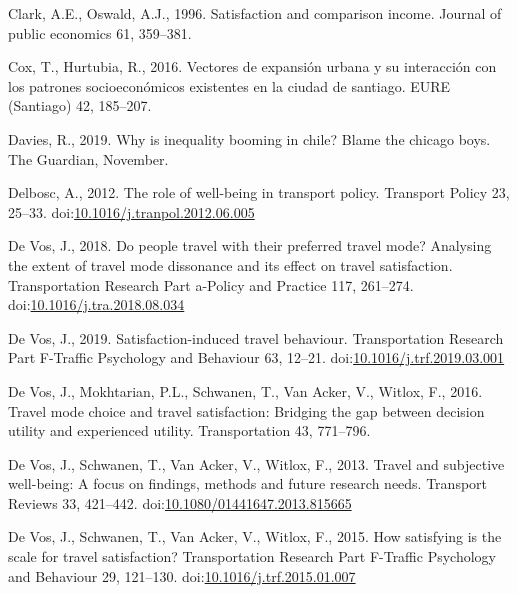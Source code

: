 \documentclass[]{elsarticle} %
\begin{document}
\leavevmode\hypertarget{ref-Clark1996satisfaction}{}%
Clark, A.E., Oswald, A.J., 1996. Satisfaction and comparison income.
Journal of public economics 61, 359--381.

\leavevmode\hypertarget{ref-Cox2016}{}%
Cox, T., Hurtubia, R., 2016. Vectores de expansión urbana y su
interacción con los patrones socioeconómicos existentes en la ciudad de
santiago. EURE (Santiago) 42, 185--207.

\leavevmode\hypertarget{ref-Davis2019}{}%
Davies, R., 2019. Why is inequality booming in chile? Blame the chicago
boys. The Guardian, November.

\leavevmode\hypertarget{ref-Delbosc2012role}{}%
Delbosc, A., 2012. The role of well-being in transport policy. Transport
Policy 23, 25--33.
doi:\href{https://doi.org/10.1016/j.tranpol.2012.06.005}{10.1016/j.tranpol.2012.06.005}

\leavevmode\hypertarget{ref-Devos2018people}{}%
De Vos, J., 2018. Do people travel with their preferred travel mode?
Analysing the extent of travel mode dissonance and its effect on travel
satisfaction. Transportation Research Part a-Policy and Practice 117,
261--274.
doi:\href{https://doi.org/10.1016/j.tra.2018.08.034}{10.1016/j.tra.2018.08.034}

\leavevmode\hypertarget{ref-Devos2019satisfaction}{}%
De Vos, J., 2019. Satisfaction-induced travel behaviour. Transportation
Research Part F-Traffic Psychology and Behaviour 63, 12--21.
doi:\href{https://doi.org/10.1016/j.trf.2019.03.001}{10.1016/j.trf.2019.03.001}

\leavevmode\hypertarget{ref-Devos2016travel}{}%
De Vos, J., Mokhtarian, P.L., Schwanen, T., Van Acker, V., Witlox, F.,
2016. Travel mode choice and travel satisfaction: Bridging the gap
between decision utility and experienced utility. Transportation 43,
771--796.

\leavevmode\hypertarget{ref-Devos2013travel}{}%
De Vos, J., Schwanen, T., Van Acker, V., Witlox, F., 2013. Travel and
subjective well-being: A focus on findings, methods and future research
needs. Transport Reviews 33, 421--442.
doi:\href{https://doi.org/10.1080/01441647.2013.815665}{10.1080/01441647.2013.815665}

\leavevmode\hypertarget{ref-Devos2015satisfying}{}%
De Vos, J., Schwanen, T., Van Acker, V., Witlox, F., 2015. How
satisfying is the scale for travel satisfaction? Transportation Research
Part F-Traffic Psychology and Behaviour 29, 121--130.
doi:\href{https://doi.org/10.1016/j.trf.2015.01.007}{10.1016/j.trf.2015.01.007}
\end{document}
